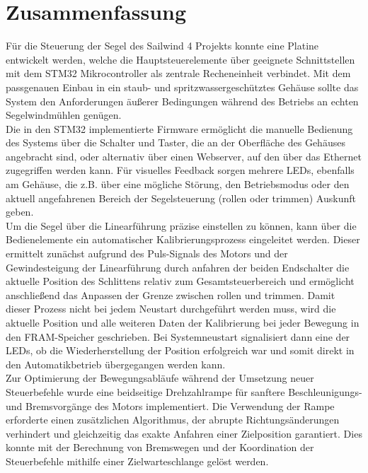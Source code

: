 \newpage
\section{Zusammenfassung}
Für die Steuerung der Segel des Sailwind 4 Projekts konnte eine Platine entwickelt werden, welche die Hauptsteuerelemente über geeignete Schnittstellen mit dem STM32 Mikrocontroller als zentrale Recheneinheit verbindet. Mit dem passgenauen Einbau in ein staub- und spritzwassergeschütztes Gehäuse sollte das System den Anforderungen äußerer Bedingungen während des Betriebs an echten Segelwindmühlen genügen.\\

\noindent
Die in den STM32 implementierte Firmware ermöglicht die manuelle Bedienung des Systems über die Schalter und Taster, die an der Oberfläche des Gehäuses angebracht sind, oder alternativ über einen Webserver, auf den über das Ethernet zugegriffen werden kann. Für visuelles Feedback sorgen mehrere LEDs, ebenfalls am Gehäuse, die z.B. über eine mögliche Störung, den Betriebsmodus oder den aktuell angefahrenen Bereich der Segelsteuerung (rollen oder trimmen) Auskunft geben. \\

\noindent
Um die Segel über die Linearführung präzise einstellen zu können, kann über die Bedienelemente ein automatischer Kalibrierungsprozess eingeleitet werden. Dieser ermittelt zunächst aufgrund des Puls-Signals des Motors und der Gewindesteigung der Linearführung durch anfahren der beiden Endschalter die aktuelle Position des Schlittens relativ zum Gesamtsteuerbereich und ermöglicht anschließend das Anpassen der Grenze zwischen rollen und trimmen. Damit dieser Prozess nicht bei jedem Neustart durchgeführt werden muss, wird die aktuelle Position und alle weiteren Daten der Kalibrierung bei jeder Bewegung in den FRAM-Speicher geschrieben. Bei Systemneustart signalisiert dann eine der LEDs, ob die Wiederherstellung der Position erfolgreich war und somit direkt in den Automatikbetrieb übergegangen werden kann. \\

\noindent
Zur Optimierung der Bewegungsabläufe während der Umsetzung neuer Steuerbefehle wurde eine beidseitige Drehzahlrampe für sanftere Beschleunigungs- und Bremsvorgänge des Motors implementiert. Die Verwendung der Rampe erforderte einen zusätzlichen Algorithmus, der abrupte Richtungsänderungen verhindert und gleichzeitig das exakte Anfahren einer Zielposition garantiert. Dies konnte mit der Berechnung von Bremswegen und der Koordination der Steuerbefehle mithilfe einer Zielwarteschlange gelöst werden.

